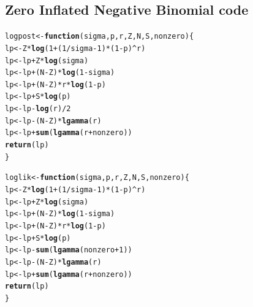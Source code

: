 \documentclass{article}\usepackage[]{graphicx}\usepackage[]{color}
\makeatletter
\newcommand{\hlnum}[1]{\textcolor[rgb]{0.686,0.059,0.569}{#1}}%
\newcommand{\hlopt}[1]{\textcolor[rgb]{0,0,0}{#1}}%
\newcommand{\hlstd}[1]{\textcolor[rgb]{0.345,0.345,0.345}{#1}}%
\newcommand{\hlkwa}[1]{\textcolor[rgb]{0.161,0.373,0.58}{\textbf{#1}}}%
\newcommand{\hlkwb}[1]{\textcolor[rgb]{0.69,0.353,0.396}{#1}}%
\newcommand{\hlkwc}[1]{\textcolor[rgb]{0.333,0.667,0.333}{#1}}%
\newcommand{\hlkwd}[1]{\textcolor[rgb]{0.737,0.353,0.396}{\textbf{#1}}}%
\newenvironment{kframe}{%
 \def\at@end@of@kframe{}%
 \ifinner\ifhmode%
  \def\at@end@of@kframe{\end{minipage}}%
  \begin{minipage}{\columnwidth}%
 \fi\fi%
 \def\FrameCommand##1{\hskip\@totalleftmargin \hskip-\fboxsep
 \colorbox{shadecolor}{##1}\hskip-\fboxsep
     \hskip-\linewidth \hskip-\@totalleftmargin \hskip\columnwidth}%
 \MakeFramed {\advance\hsize-\width
   \@totalleftmargin\z@ \linewidth\hsize
   \@setminipage}}%
 {\par\unskip\endMakeFramed%
 \at@end@of@kframe}
\newenvironment{knitrout}{}{} %
\makeatother
\begin{document}
\subsection{Zero Inflated Negative Binomial code}
\label{a:cZINB}
\begin{knitrout}
\color{fgcolor}\begin{kframe}
\begin{alltt}
\hlstd{logpost} \hlkwb{<-} \hlkwa{function}\hlstd{(}\hlkwc{sigma}\hlstd{,} \hlkwc{p}\hlstd{,} \hlkwc{r}\hlstd{,} \hlkwc{Z}\hlstd{,} \hlkwc{N}\hlstd{,} \hlkwc{S}\hlstd{,} \hlkwc{nonzero}\hlstd{)\{}
  \hlstd{lp} \hlkwb{<-} \hlstd{Z}\hlopt{*}\hlkwd{log}\hlstd{(}\hlnum{1} \hlopt{+} \hlstd{(}\hlnum{1}\hlopt{/}\hlstd{sigma}\hlopt{-}\hlnum{1}\hlstd{)}\hlopt{*}\hlstd{(}\hlnum{1}\hlopt{-}\hlstd{p)}\hlopt{^}\hlstd{r)}
  \hlstd{lp} \hlkwb{<-} \hlstd{lp} \hlopt{+} \hlstd{Z}\hlopt{*}\hlkwd{log}\hlstd{(sigma)}
  \hlstd{lp} \hlkwb{<-} \hlstd{lp} \hlopt{+} \hlstd{(N}\hlopt{-}\hlstd{Z)}\hlopt{*}\hlkwd{log}\hlstd{(}\hlnum{1}\hlopt{-}\hlstd{sigma)}
  \hlstd{lp} \hlkwb{<-} \hlstd{lp} \hlopt{+} \hlstd{(N}\hlopt{-}\hlstd{Z)}\hlopt{*}\hlstd{r}\hlopt{*}\hlkwd{log}\hlstd{(}\hlnum{1}\hlopt{-}\hlstd{p)}
  \hlstd{lp} \hlkwb{<-} \hlstd{lp} \hlopt{+} \hlstd{S}\hlopt{*}\hlkwd{log}\hlstd{(p)}
  \hlstd{lp} \hlkwb{<-} \hlstd{lp} \hlopt{-} \hlkwd{log}\hlstd{(r)}\hlopt{/}\hlnum{2}
  \hlstd{lp} \hlkwb{<-} \hlstd{lp} \hlopt{-} \hlstd{(N}\hlopt{-}\hlstd{Z)}\hlopt{*}\hlkwd{lgamma}\hlstd{(r)}
  \hlstd{lp} \hlkwb{<-} \hlstd{lp} \hlopt{+} \hlkwd{sum}\hlstd{(}\hlkwd{lgamma}\hlstd{(r}\hlopt{+}\hlstd{nonzero))}
  \hlkwd{return}\hlstd{(lp)}
\hlstd{\}}

\hlstd{loglik} \hlkwb{<-} \hlkwa{function}\hlstd{(}\hlkwc{sigma}\hlstd{,} \hlkwc{p}\hlstd{,} \hlkwc{r}\hlstd{,} \hlkwc{Z}\hlstd{,} \hlkwc{N}\hlstd{,} \hlkwc{S}\hlstd{,} \hlkwc{nonzero}\hlstd{)\{}
  \hlstd{lp} \hlkwb{<-} \hlstd{Z}\hlopt{*}\hlkwd{log}\hlstd{(}\hlnum{1} \hlopt{+} \hlstd{(}\hlnum{1}\hlopt{/}\hlstd{sigma}\hlopt{-}\hlnum{1}\hlstd{)}\hlopt{*}\hlstd{(}\hlnum{1}\hlopt{-}\hlstd{p)}\hlopt{^}\hlstd{r)}
  \hlstd{lp} \hlkwb{<-} \hlstd{lp} \hlopt{+} \hlstd{Z}\hlopt{*}\hlkwd{log}\hlstd{(sigma)}
  \hlstd{lp} \hlkwb{<-} \hlstd{lp} \hlopt{+} \hlstd{(N}\hlopt{-}\hlstd{Z)}\hlopt{*}\hlkwd{log}\hlstd{(}\hlnum{1}\hlopt{-}\hlstd{sigma)}
  \hlstd{lp} \hlkwb{<-} \hlstd{lp} \hlopt{+} \hlstd{(N}\hlopt{-}\hlstd{Z)}\hlopt{*}\hlstd{r}\hlopt{*}\hlkwd{log}\hlstd{(}\hlnum{1}\hlopt{-}\hlstd{p)}
  \hlstd{lp} \hlkwb{<-} \hlstd{lp} \hlopt{+} \hlstd{S}\hlopt{*}\hlkwd{log}\hlstd{(p)}
  \hlstd{lp} \hlkwb{<-} \hlstd{lp} \hlopt{-} \hlkwd{sum}\hlstd{(}\hlkwd{lgamma}\hlstd{(nonzero}\hlopt{+}\hlnum{1}\hlstd{))}
  \hlstd{lp} \hlkwb{<-} \hlstd{lp} \hlopt{-} \hlstd{(N}\hlopt{-}\hlstd{Z)}\hlopt{*}\hlkwd{lgamma}\hlstd{(r)}
  \hlstd{lp} \hlkwb{<-} \hlstd{lp} \hlopt{+} \hlkwd{sum}\hlstd{(}\hlkwd{lgamma}\hlstd{(r}\hlopt{+}\hlstd{nonzero))}
  \hlkwd{return}\hlstd{(lp)}
\hlstd{\}}


\end{alltt}
\end{kframe}
\end{knitrout}
\end{document}
